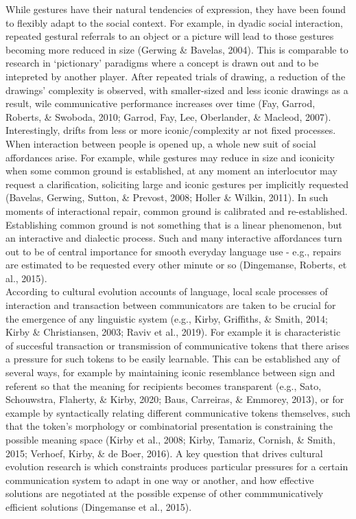 \documentclass[
  man, noextraspace,floatsintext]{apa6}
\begin{document}
While gestures have their natural tendencies of expression, they have been found to flexibly adapt to the social context. For example, in dyadic social interaction, repeated gestural referrals to an object or a picture will lead to those gestures becoming more reduced in size (Gerwing \& Bavelas, 2004). This is comparable to research in `pictionary' paradigms where a concept is drawn out and to be intepreted by another player. After repeated trials of drawing, a reduction of the drawings' complexity is observed, with smaller-sized and less iconic drawings as a result, wile communicative performance increases over time (Fay, Garrod, Roberts, \& Swoboda, 2010; Garrod, Fay, Lee, Oberlander, \& Macleod, 2007). Interestingly, drifts from less or more iconic/complexity ar not fixed processes. When interaction between people is opened up, a whole new suit of social affordances arise. For example, while gestures may reduce in size and iconicity when some common ground is established, at any moment an interlocutor may request a clarification, soliciting large and iconic gestures per implicitly requested (Bavelas, Gerwing, Sutton, \& Prevost, 2008; Holler \& Wilkin, 2011). In such moments of interactional repair, common ground is calibrated and re-established. Establishing common ground is not something that is a linear phenomenon, but an interactive and dialectic process. Such and many interactive affordances turn out to be of central importance for smooth everyday language use - e.g., repairs are estimated to be requested every other minute or so (Dingemanse, Roberts, et al., 2015).\\
According to cultural evolution accounts of language, local scale processes of interaction and transaction between communicators are taken to be crucial for the emergence of any linguistic system (e.g., Kirby, Griffiths, \& Smith, 2014; Kirby \& Christiansen, 2003; Raviv et al., 2019). For example it is characteristic of succesful transaction or transmission of communicative tokens that there arises a pressure for such tokens to be easily learnable. This can be established any of several ways, for example by maintaining iconic resemblance between sign and referent so that the meaning for recipients becomes transparent (e.g., Sato, Schouwstra, Flaherty, \& Kirby, 2020; Baus, Carreiras, \& Emmorey, 2013), or for example by syntactically relating different communicative tokens themselves, such that the token's morphology or combinatorial presentation is constraining the possible meaning space (Kirby et al., 2008; Kirby, Tamariz, Cornish, \& Smith, 2015; Verhoef, Kirby, \& de Boer, 2016). A key question that drives cultural evolution research is which constraints produces particular pressures for a certain communication system to adapt in one way or another, and how effective solutions are negotiated at the possible expense of other commmunicatively efficient solutions (Dingemanse et al., 2015).\\
\end{document}

